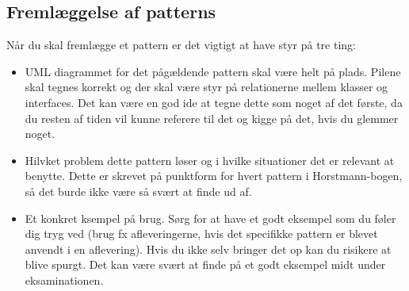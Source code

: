 \subsection{Fremlæggelse af patterns}
Når du skal fremlægge et pattern er det vigtigt at have styr på tre ting:
\begin{itemize}
    \item UML diagrammet for det pågældende pattern skal være helt på plads. Pilene skal tegnes korrekt og der skal være styr på relationerne mellem klasser og interfaces. Det kan være en god ide at tegne dette som noget af det første, da du resten af tiden vil kunne referere til det og kigge på det, hvis du glemmer noget.
    \item Hilvket problem dette pattern løser og i hvilke situationer det er relevant at benytte. Dette er skrevet på punktform for hvert pattern i Horstmann-bogen, så det burde ikke være så svært at finde ud af.
    \item Et konkret ksempel på brug. Sørg for at have et godt eksempel som du føler dig tryg ved (brug fx afleveringerne, hvis det specifikke pattern er blevet anvendt i en aflevering). Hvis du ikke selv bringer det op kan du risikere at blive spurgt. Det kan være svært at finde på et godt eksempel midt under eksaminationen.
\end{itemize}
